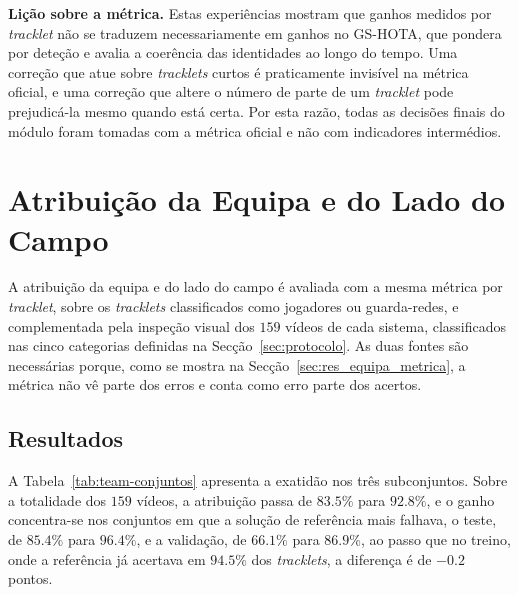 \medskip\noindent\textbf{Lição sobre a métrica.} Estas experiências mostram que ganhos medidos por
\emph{tracklet} não se traduzem necessariamente em ganhos no GS-HOTA, que pondera por deteção e
avalia a coerência das identidades ao longo do tempo. Uma correção que atue sobre \emph{tracklets}
curtos é praticamente invisível na métrica oficial, e uma correção que altere o número de parte de
um \emph{tracklet} pode prejudicá-la mesmo quando está certa. Por esta razão, todas as decisões
finais do módulo foram tomadas com a métrica oficial e não com indicadores intermédios.

\section{Atribuição da Equipa e do Lado do Campo}\label{sec:res_equipa}

A atribuição da equipa e do lado do campo é avaliada com a mesma métrica por \emph{tracklet},
sobre os \emph{tracklets} classificados como jogadores ou guarda-redes, e complementada pela inspeção
visual dos $159$ vídeos de cada sistema, classificados nas cinco categorias definidas na
Secção~\ref{sec:protocolo}. As duas fontes são necessárias porque, como se mostra na
Secção~\ref{sec:res_equipa_metrica}, a métrica não vê parte dos erros e conta como erro parte dos
acertos.

\subsection{Resultados}\label{sec:res_equipa_resultados}

A Tabela~\ref{tab:team-conjuntos} apresenta a exatidão nos três subconjuntos. Sobre a totalidade
dos $159$ vídeos, a atribuição passa de $83.5\%$ para $92.8\%$, e o ganho concentra-se
nos conjuntos em que a solução de referência mais falhava, o teste, de $85.4\%$ para
$96.4\%$, e a validação, de $66.1\%$ para $86.9\%$, ao passo que no treino,
onde a referência já acertava em $94.5\%$ dos \emph{tracklets}, a diferença é de
$-0.2$ pontos.

